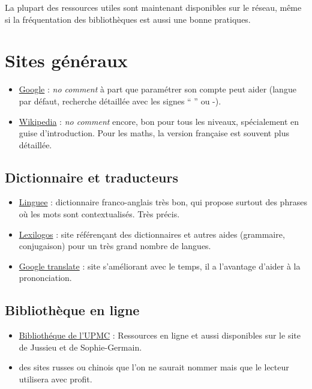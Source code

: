 
La plupart des ressources utiles sont maintenant disponibles sur le réseau,
même si la fréquentation des bibliothèques est aussi une bonne pratiques.


\section{Sites généraux}
\begin{itemize}
 \item \href{www.google.com}{Google} : 
\textit{no comment} à part que paramétrer son compte
peut aider (langue par défaut, recherche détaillée avec les signes `` '' ou -).

\item \href{http://wikipedia.org/}{Wikipedia} : \textit{no comment} encore, 
bon pour tous les niveaux, spécialement en guise d'introduction. Pour les maths,
la version française est souvent plus détaillée.

\end{itemize}




\subsection{Dictionnaire et traducteurs}

\begin{itemize}
\item \href{http://www.linguee.com/}{Linguee} : dictionnaire franco-anglais très bon, qui propose 
surtout des phrases où les mots sont contextualisés. Très précis.
\item \href{http://www.lexilogos.com/}{Lexilogos} : site référençant des dictionnaires et autres
aides (grammaire, conjugaison) pour un très grand nombre de langues. 
\item \href{https://translate.google.fr/}{Google translate} : site s'améliorant avec le temps, 
il a l'avantage d'aider à la prononciation.
\end{itemize}


\subsection{Biblioth\`eque en ligne}

\begin{itemize}

\item \href{http://catalogue-bibliotheques.upmc.fr/#focus}{Biblioth\'eque de l'UPMC} : Ressources en 
ligne et aussi disponibles sur le site de Jussieu et de Sophie-Germain.

\item des sites russes ou chinois que l'on ne saurait nommer mais que le lecteur utilisera avec profit.

\end{itemize}


